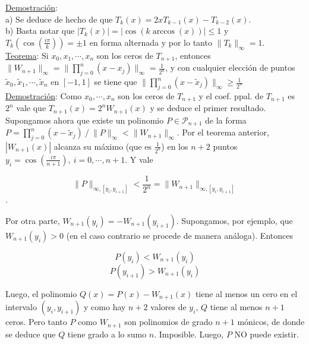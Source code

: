 \underline{Demostraci\'on}:\\

a) Se deduce de hecho de que $T_{k}(x) = 2xT_{k - 1}(x) - T_{k - 2}(x)$.\\

b) Basta notar que $|T_{k}(x)| = |\cos(k\arccos(x))| \leq 1$ y $T_{k}(\cos(\frac{i\pi}{k})) = \pm 1$ en forma alternada y por lo tanto $\|T_{k}\|_{\infty} = 1$.\\

\underline{Teorema}: Si $x_{0}, x_{1}, \cdots, x_{n}$ son los ceros de $T_{n + 1}$, entonces $\|W_{n + 1}\|_{\infty} = \|\prod \limits_{j = 0}^{n} (x - x_{j})\|_{\infty} = \frac{1}{2^{n}}$, y con cualquier elecci\'on de puntos $\tilde{x}_{0}, \tilde{x}_{1}, \cdots, \tilde{x}_{n}$ en $[-1, 1]$ se tiene que $\|\prod \limits_{j = 0}^{n} (x - \tilde{x}_{j})\|_{\infty} \geq \frac{1}{2^{n}}$\\

\underline{Demostraci\'on}: Como $x_{0}, \cdots, x_{n}$ son los ceros de $T_{n + 1}$ y el coef. ppal. de $T_{n + 1}$ es $2^{n}$ vale que $T_{n + 1}(x) = 2^{n}W_{n + 1}(x)$ y se deduce el primer resultado.\\

Supongamos ahora que existe un polinomio $P \in \mathcal{P}_{n + 1}$ de la forma $P = \prod \limits_{j = 0}^{n} (x - \tilde{x}_{j})\ / \ \|P\|_{\infty} < \|W_{n + 1}\|_{\infty}$. Por el teorema anterior, $|W_{n + 1}(x)|$ alcanza su m\'aximo (que es $\frac{1}{2^{n}}$) en los $n + 2$ puntos $y_{i} = \cos(\frac{i\pi}{n + 1}),\ i = 0, \cdots, n + 1$. Y vale

$$\|P\|_{\infty, [y_{i}, y_{i + 1}]} < \frac{1}{2^{n}} = \|W_{n + 1}\|_{\infty, [y_{i}, y_{i + 1}]}$$.

Por otra parte, $W_{n + 1}(y_{i}) = -W_{n + 1}(y_{i + 1})$. Supongamos, por ejemplo, que $W_{n + 1}(y_{i}) > 0$ (en el caso contrario se procede de manera an\'aloga). Entonces

$$P(y_{i}) < W_{n + 1}(y_{i})$$
$$P(y_{i + 1}) > W_{n + 1}(y_{i})$$

Luego, el polinomio $Q(x) = P(x) - W_{n + 1}(x)$ tiene al menos un cero en el intervalo $(y_{i}, y_{i + 1})$ y como hay $n + 2$ valores de $y_{i}$, $Q$ tiene al menos $n + 1$ ceros. Pero tanto $P$ como $W_{n + 1}$ son polinomios de grado $n + 1$ m\'onicos, de donde se deduce que $Q$ tiene grado a lo sumo $n$. Imposible. Luego, $P$ NO puede existir.\\